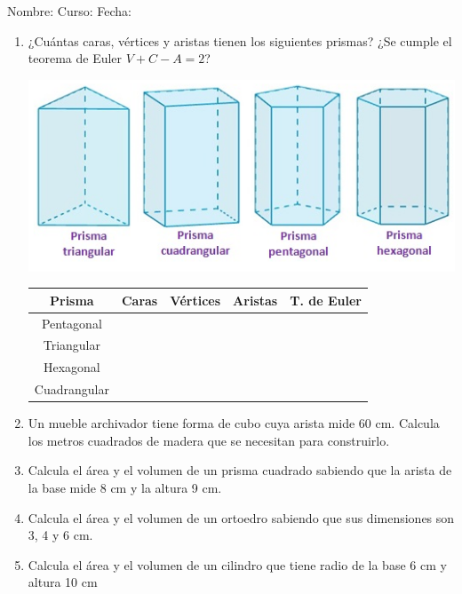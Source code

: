 \documentclass[fleqn]{article}
\newcommand{\LineaNombre}{%
\par
\vspace{\baselineskip}
Nombre:\hrulefill \; Curso: \underline{\hspace*{48pt}} \; Fecha: \underline{\hspace*{2.5cm}} \relax
\par}
\begin{document}
\LineaNombre
\begin{enumerate}
 \item ¿Cuántas caras, vértices y aristas tienen los siguientes prismas? ¿Se cumple el teorema de Euler $V+C-A=2$?
 
 \begin{minipage}{.35\textwidth}
  \includegraphics[scale=0.275]{Images/Pantallazo-2017-07-10_19-49-43.png} 
 \end{minipage}\hfill
 \begin{minipage}{.6\textwidth}
 \begin{tabular}{|c|c|c|c|c|}
 \hline 
 Prisma & Caras & Vértices & Aristas & T. de Euler\\ 
 \hline 
 Pentagonal &  &  & & \\ 
 \hline 
 Triangular &  &  &  &\\ 
 \hline 
 Hexagonal &  &  & & \\ 
 \hline 
 Cuadrangular &  &  & &  \\ 
 \hline 
 \end{tabular} 
 \end{minipage}
 \item Un mueble archivador tiene forma de cubo cuya arista mide
60 cm. Calcula los metros cuadrados de madera que se necesitan para construirlo.\noanswer
\item Calcula el área y el volumen de un prisma cuadrado sabiendo que la arista de la base mide 8 cm y la altura 9 cm.\noanswer
\newpage
\item Calcula el área y el volumen de un ortoedro sabiendo que sus dimensiones son 3, 4 y 6 cm.\noanswer
\item Calcula el área y el volumen de un cilindro que tiene radio de la base 6 cm y altura 10 cm\noanswer
 \end{enumerate}
\end{document}
